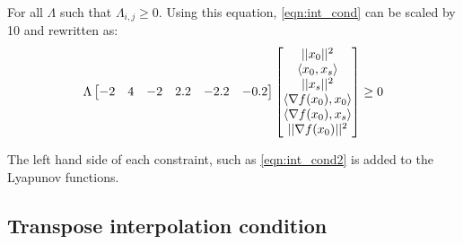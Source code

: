 For all $\Lambda $ such that $\Lambda_{i,j} \geq 0$. Using this equation, \ref{eqn:int_cond} can be scaled by 10 and rewritten as: \label{eqn:int_cond3}
\begin{equation} 
	\Lambda\begin{bmatrix}-2 & 4 & -2 & 2.2 & -2.2 & -0.2\end{bmatrix}\begin{bmatrix}||x_0||^2 \\ \langle x_0, x_s \rangle \\ ||x_s||^2 \\ \langle \nabla f(x_0), x_0 \rangle \\ \langle \nabla f(x_0), x_s \rangle \\ ||\nabla f(x_0)||^2\end{bmatrix} \geq 0
\end{equation}


	


The left hand side of each constraint, such as \ref{eqn:int_cond2} is added to the Lyapunov functions.

\subsection*{Transpose interpolation condition}


